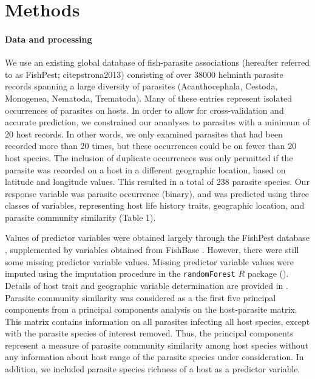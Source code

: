 \documentclass[12pt]{article}
\begin{document}



 
\section{Methods}
 \paragraph{Data and processing}
  We use an existing global database of fish-parasite associations (hereafter referred to as FishPest; citep{strona2013}) consisting of over 38000 helminth parasite records spanning a large diversity of parasites (Acanthocephala, Cestoda, Monogenea, Nematoda, Trematoda). Many of these entries represent isolated occurrences of parasites on hosts. In order to allow for cross-validation and accurate prediction, we constrained our ananlyses to parasites with a minimum of 20 host records. In other words, we only examined parasites that had been recorded more than 20 times, but these occurrences could be on fewer than 20 host species. The inclusion of duplicate occurrences was only permitted if the parasite was recorded on a host in a different geographic location, based on latitude and longitude values. This resulted in a total of 238 parasite species. Our response variable was parasite occurrence (binary), and was predicted using three classes of variables, representing host life history traits, geographic location, and parasite community similarity (Table 1). 
  
  Values of predictor variables were obtained largely through the FishPest database \cite{strona2012, strona2013}, supplemented by variables obtained from FishBase \cite{froese2010}. However, there were still some missing predictor variable values. Missing predictor variable values were imputed using the imputation procedure in the \texttt{randomForest} $R$ package (\cite{randomForest}). Details of host trait and geographic variable determination are provided in \cite{strona2013}. Parasite community similarity was considered as a the first five principal components from a principal components analysis on the host-parasite matrix. This matrix contains information on all parasites infecting all host species, except with the parasite species of interest removed. Thus, the principal components represent a measure of parasite community similarity among host species without any information about host range of the parasite species under consideration. In addition, we included parasite species richness of a host as a predictor variable.   
  
\end{document}
